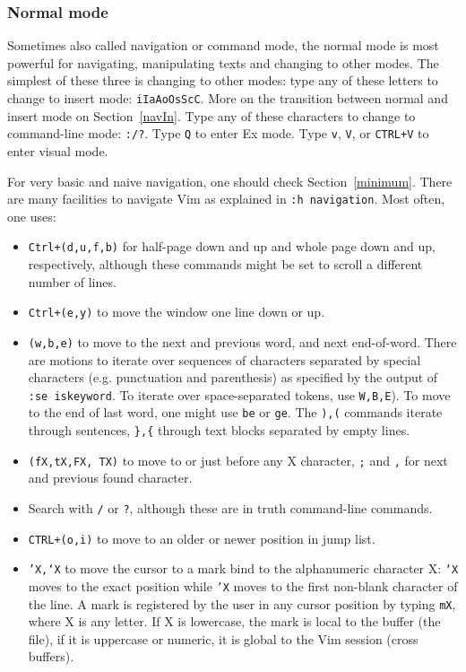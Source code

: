 \documentclass{article}
\newcommand{\tttt}[1]{\texttt{#1}}
\begin{document}
\subsubsection{Normal mode}\label{normal}
Sometimes also called navigation or command mode,
the normal mode is most powerful for
navigating, manipulating texts and changing to other modes.
The simplest of these three is changing to other modes:
type any of these letters to change to insert mode:
\texttt{iIaAoOsScC}. More on the transition between
normal and insert mode on Section~\ref{navIn}.
Type any of these characters to change to command-line mode:
\texttt{:/?}.
Type \texttt{Q} to enter Ex mode.
Type \texttt{v}, \texttt{V}, or \texttt{CTRL+V} to enter visual mode.

For very basic and naive navigation, one should check Section~\ref{minimum}.
There are many facilities to navigate Vim
as explained in \texttt{:h navigation}.
Most often, one uses:
\begin{itemize}
  \item \texttt{Ctrl+(d,u,f,b)} for half-page down and up
and whole page down and up, respectively, although these commands might
be set to scroll a different number of lines.
  \item \texttt{Ctrl+(e,y)} to move the window one line down or up.
  \item \texttt{(w,b,e)} to move to the next and previous word,
    and next end-of-word.
    There are motions to iterate over sequences of characters separated
    by special characters (e.g. punctuation and parenthesis) as
    specified by the output of \texttt{:se iskeyword}.
    To iterate over space-separated tokens, use \texttt{W,B,E}).
    To move to the end of last word, one might use \texttt{be}
    or \texttt{ge}.
The \texttt{),(} commands iterate through sentences,
		\tttt{\},\{} through text blocks separated by empty lines.
  \item \texttt{(fX,tX,FX, TX)} to move to or just before any X character,
	  \tttt{;} and \tttt{,} for next and previous found character.
  \item Search with \tttt{/} or \tttt{?}, although these are in truth command-line commands.
  \item \texttt{CTRL+(o,i)} to move to an older or newer position in
    jump list.
  \item \texttt{'X,`X} to move the cursor to a mark bind to the alphanumeric character X:
    \texttt{`X} moves to the exact position while \texttt{'X} moves to
    the first non-blank character of the line.
    A mark is registered by the user in any cursor position
    by typing \texttt{mX}, where X is any letter.
    If X is lowercase, the mark is local to the buffer (the file),
    if it is uppercase or numeric, it is global to the Vim session
    (cross buffers).
\end{itemize}
\end{document}
